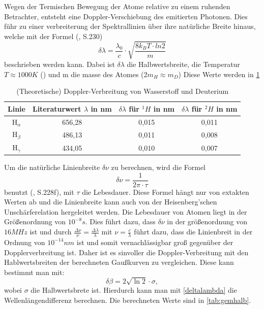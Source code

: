 Wegen der Termischen Bewegung der Atome relative zu einem ruhenden Betrachter, entsteht eine Doppler-Verschiebung des emitierten Photonen. 
Dies führ zu einer verbreiterung der Spektrallinien über ihre natürliche Breite hinaus, welche mit der Formel (\cite{Demtröder_Ex3}, S.230)
\begin{equation}
    \delta\lambda = \frac{\lambda_0}{c}\cdot \sqrt{\frac{8k_BT\cdot ln2}{m}}
\end{equation}
beschrieben werden kann.
Dabei ist $\delta\lambda$ die Halbwertsbreite, die Temperatur $T \approx 1000K$ (\cite{praktikum}) und m die masse des Atomes (2$m_H \approx m_D$)
Diese Werte werden in \cref{tab:dopplerTemp}
\begin{table}[htbp]
    \centering
    \begin{tabular}{|c|c|c|c|}
    \hline
    Linie & Literaturwert $\lambda$ in nm & $\delta\lambda$ für $^1H$ in nm & $\delta\lambda$ für $^2H$ in nm \\
    \midrule
    H$_\alpha$ & 656,28 & 0,015 & 0,011 \\
    H$_\beta$ & 486,13 & 0,011 & 0,008 \\
    H$_\gamma$  & 434,05 & 0,010 & 0,007 \\
    \hline
    \end{tabular}
    \caption{(Theoretische) Doppler-Verbreitung von Wasserstoff und Deuterium}
    \label{tab:dopplerTemp}
\end{table}

Um die natürliche Linienbreite $\delta\nu$ zu berechnen, wird die Formel
\begin{equation}
    \delta \nu = \frac{1}{2\pi \cdot \tau}
\end{equation}
benutzt (\cite{Demtröder_Ex3}, S.228f), mit $\tau$ die Lebesdauer. 
Diese Formel hängt nur von extakten Werten ab und die Linienbreite kann auch von der Heisenberg'schen Unschärferelation hergeleitet werden.  
Die Lebesdauer von Atomen liegt in der Größenordnung von $10^{-8}s$. 
Dies führt dazu, dass $\delta\nu$ in der größenordnung von $16MHz$  ist und durch $\frac{\Delta\nu}{\nu} = \frac{\Delta\lambda}{\lambda}$ mit $\nu = \frac{c}{\lambda}$ führt dazu, dass die Linienbreit in der Ordnung von $10^{-14}nm$ ist und somit vernachlässigbar groß gegenüber der Dopplerverbreitung ist.
Daher ist es sinvoller die Doppler-Verbreitung mit den Hablwertsbreiten der berechneten Gaußkurven zu vergleichen.
Diese kann bestimmt man mit:
\begin{equation}
    \delta\beta = 2\sqrt{\ln{2}}\cdot \sigma,
\end{equation}
wobei $\sigma$ die Halbwertsbrete ist.
Hierdurch kann man mit \cref{deltalambda} die Wellenlängendifferenz berechnen.
Die berechneten Werte sind in \cref{tab:gemhalb}.

